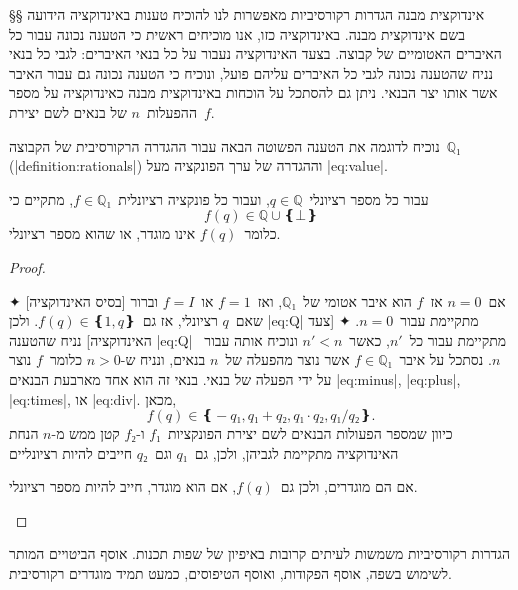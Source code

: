 §§ אינדוקצית מבנה
הגדרות רקורסיביות מאפשרות לנו להוכיח טענות באינדוקציה הידועה בשם אינדוקצית
מבנה. באינדוקציה כזו, אנו מוכיחים ראשית כי הטענה נכונה עבור כל האיברים האטומיים
של קבוצה. בצעד האינדוקציה נעבור על כל בנאי האיברים: לגבי כל בנאי נניח שהטענה
נכונה לגבי כל האיברים עליהם פועל, ונוכיח כי הטענה נכונה גם עבור האיבר אשר אותו
יצר הבנאי. ניתן גם להסתכל על הוכחות באינדוקצית מבנה כאינדוקציה על מספר
ההפעלות~$n$ של בנאים לשם יצירת~$f$.

נוכיח לדוגמה את הטענה הפשוטה הבאה עבור ההגדרה הרקורסיבית של הקבוצה~$ℚ₁$
(|definition:rationals|) וההגדרה של ערך הפונקציה מעל |eq:value|.

\begin{claim}
  עבור כל מספר רציונלי~$q∈ℚ$, ועבור כל פונקציה רציונלית~$f∈ℚ₁$, מתקיים כי
  \begin{equation}\label{eq:Q}
    f(q)∈ℚ∪❴⊥❵
  \end{equation}
  כלומר~$f(q)$ אינו מוגדר, או שהוא מספר רציונלי.
\end{claim}

\begin{proof}
  \mbox{}
  \begin{description}
    ✦ [בסיס האינדוקציה] אם~$n=0$ אז~$f$ הוא איבר אטומי של~$ℚ₁$,
    ואז~$f=1$ או~$f=I$ וברור שאם~$q$ רציונלי, אז גם~$f(q)∈❴1,q❵$. ולכן
    |eq:Q| מתקיימת עבור~$n=0$.
    ✦ [צעד האינדוקציה] נניח שהטענה |eq:Q| מתקיימת עבור כל~$n'$, כאשר~$n'<n$
    ונוכיח אותה עבור~$n$.
    נסתכל על איבר~$f∈ℚ₁$ אשר נוצר מהפעלה של~$n$ בנאים, ונניח ש-$n>0$ כלומר~$f$
    נוצר על ידי הפעלה של בנאי. בנאי זה הוא אחד מארבעת הבנאים |eq:minus|,
    |eq:plus|, |eq:times|, או |eq:div|.
    מכאן, \[
      f(q)∈❴-q₁,q₁+q₂,q₁·q₂,q₁/q₂❵.
\] כיוון שמספר הפעולות הבנאים לשם יצירת הפונקציות~$f₁$ ו-$f₂$ קטן ממש מ-$n$
    הנחת האינדוקציה מתקיימת לגביהן, ולכן, גם~$q₁$ וגם~$q₂$ חייבים להיות רציונליים

    אם הם מוגדרים, ולכן גם~$f(q)$,
    אם הוא מוגדר, חייב
    להיות מספר רציונלי.
  \end{description}
\end{proof}

הגדרות רקורסיביות משמשות לעיתים קרובות באיפיון של שפות תכנות. אוסף הביטויים
המותר לשימוש בשפה, אוסף הפקודות, ואוסף הטיפוסים, כמעט תמיד מוגדרים רקורסיבית.


